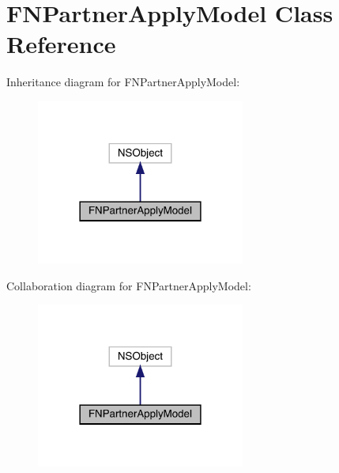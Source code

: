\hypertarget{interface_f_n_partner_apply_model}{}\section{F\+N\+Partner\+Apply\+Model Class Reference}
\label{interface_f_n_partner_apply_model}


Inheritance diagram for F\+N\+Partner\+Apply\+Model\+:\nopagebreak
\begin{figure}[H]
\begin{center}
\leavevmode
\includegraphics[width=194pt]{interface_f_n_partner_apply_model__inherit__graph}
\end{center}
\end{figure}


Collaboration diagram for F\+N\+Partner\+Apply\+Model\+:\nopagebreak
\begin{figure}[H]
\begin{center}
\leavevmode
\includegraphics[width=194pt]{interface_f_n_partner_apply_model__coll__graph}
\end{center}
\end{figure}
